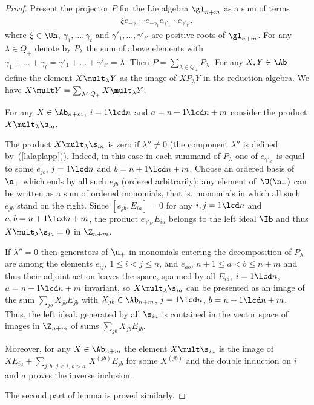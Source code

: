 \begin{proof}
Present the projector $P$ for the Lie algebra $\gl_{n+m}$ as a sum of terms
\begin{gather}
\label{wedeopro} \xi e_{-\gamma_1}\cdots e_{-\gamma_t}e_{\gamma'_{1}}\cdots e_{\gamma'_{t'}}  ,
\end{gather}
where $\xi\in\Uh$, $\gamma_1,\dots ,\gamma_t$ and $\gamma'_1,\dots ,\gamma'_{t'}$ are positive roots of $\gl_{n+m}$. For any $\lambda\in Q_+$
 denote by $P_\lambda$  the sum of above elements with $\gamma_1+\dots +\gamma_{t}=
\gamma'_1+\dots +\gamma'_{t'}=\lambda$. Then $P=\sum_{\lambda\in Q_+}P_\lambda$.
{} For any $X,Y\in\Ab$ def\/ine the element  $X\mult_\lambda Y$ as the image of $XP_\lambda Y$ in the reduction algebra. We have
$X\mult Y=\sum_{\lambda\in Q_+} X\mult_\lambda Y$.


For any $X\in\Ab_{n+m}$, $i=1\lcd n$ and $a=n+1\lcd n+m$ consider the product $X\mult_\lambda \s_{ia}$.


The product $X\mult_\lambda \s_{in}$ is zero if $\lambda''\not=0$ (the component $\lambda''$ is def\/ined by~(\ref{lalaplapp})).
Indeed, in this case in each summand of $P_\lambda$ one of $e_{\gamma'_{k'}}$ is equal to some $e_{jb}$, $j=1\lcd n$ and $b= n+1\lcd n+m$.
Choose an ordered basis of $\n_+$ which ends by all such $e_{jb}$ (ordered arbitrarily);
any element of~$\U(\n_+)$ can be written as a sum of ordered monomials, that is, monomials in which all such~$e_{jb}$ stand on the right.
Since $[e_{jb},E_{ia}]=0$ for any $i,j=1\lcd n$ and $a,b=n+1\lcd n+m$, the product
$e_{\gamma'_{k'}}E_{ia}$ belongs to the left ideal $\Ib$ and thus $X\mult_\lambda \s_{ia}=0$ in $\Z_{n+m}$.


If $\lambda''=0$ then generators of $\n_+$ in monomials entering the decomposition of  $P_\lambda$ are among the elements $e_{ij}$,
$1\leq i<j\leq n$, and $e_{ab}$, $n+1\leq a<b\leq n+m$ and thus their adjoint action leaves the space, spanned by all $E_{ia}$, $i=1\lcd n$,
$a=n+1\lcd n+m$ invariant, so $X\mult_\lambda \s_{ia}$ can be  presented as an image of the sum $\sum_{jb}X_{jb} E_{jb}$ with $X_{jb}\in\Ab_{n+m}$,
$j=1\lcd n$, $b=n+1\lcd n+m$. Thus, the left ideal, generated by all $\s_{ia}$ is contained in the vector space of images in $\Z_{n+m}$ of  sums
$\sum_{jb}X_{jb} E_{jb}$.


Moreover, for any $X\in\Ab_{n+m}$ the element $X\mult \s_{ia}$ is the image of $XE_{ia}+\sum_{j,b:\, j<i,\, b>a}\, X^{(jb)}E_{jb}$ for some $X^{(jb)}$
and the double induction on $i$ and $a$ proves the inverse inclusion.


The second part of lemma is proved similarly.
\end{proof}

